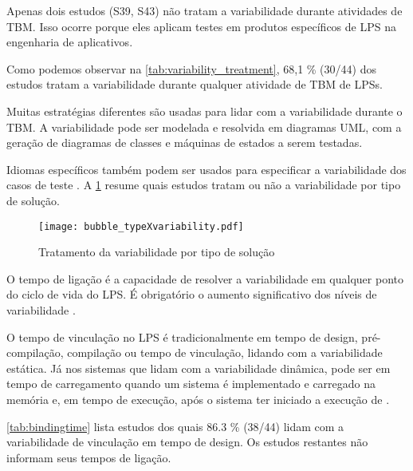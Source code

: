 Apenas dois estudos (S39, S43) não tratam a variabilidade durante atividades de TBM. Isso ocorre porque eles aplicam testes em produtos específicos de LPS na engenharia de aplicativos.

Como podemos observar na \ref{tab:variability_treatment}, 68,1 \% (30/44) dos estudos tratam a variabilidade durante qualquer atividade de TBM de LPSs. 

Muitas estratégias diferentes são usadas para lidar com a variabilidade durante o TBM. A variabilidade pode ser modelada e resolvida em diagramas UML, com a geração de diagramas de classes e máquinas de estados \cite{wang2013automated} a serem testadas. 

Idiomas específicos também podem ser usados para especificar a variabilidade dos casos de teste \cite{devroey2014behavioural}. A \ref{fig:typexvariability} resume quais estudos tratam ou não a variabilidade por tipo de solução. 

\begin{figure}[!ht]
	\centering	
	\texttt{[image: bubble\_typeXvariability.pdf]}
	\caption{Tratamento da variabilidade por tipo de solução}
	\label{fig:typexvariability}
\end{figure}

O tempo de ligação é a capacidade de resolver a variabilidade em qualquer ponto do ciclo de vida do LPS. É obrigatório o aumento significativo dos níveis de variabilidade \cite{Chen_et_al2009}.

O tempo de vinculação no LPS é tradicionalmente em tempo de design, pré-compilação, compilação ou tempo de vinculação, lidando com a variabilidade estática. Já nos sistemas que lidam com a variabilidade dinâmica, pode ser em tempo de carregamento quando um sistema é implementado e carregado na memória e, em tempo de execução, após o sistema ter iniciado a execução de \cite{Alves_et_al2009}.

\ref{tab:bindingtime} lista estudos dos quais 86.3 \% (38/44) lidam com a variabilidade de vinculação em tempo de design. Os estudos restantes não informam seus tempos de ligação.

